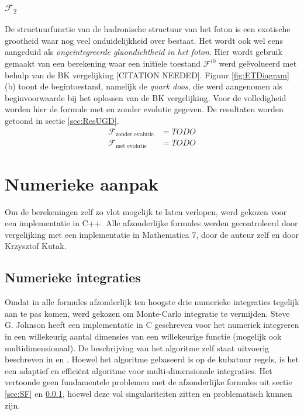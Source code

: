 \documentclass[a4paper,11pt]{article}
\numberwithin{equation}{section} %
\begin{document}
    \subsubsection{$\mathcal{F}_2$} \label{sec:UGD}
De structuurfunctie van de hadronische structuur van het foton is een exotische grootheid waar nog veel onduidelijkheid over bestaat.
Het wordt ook wel eens aangeduid als \textit{ongeïntegreerde gluondichtheid in het foton}.
Hier wordt gebruik gemaakt van een berekening waar een initïele toestand $\mathcal{F}^{(0}$ werd geëvolueerd met behulp van de BK vergelijking [CITATION NEEDED].
Figuur \ref{fig:ETDiagram} (b) toont de begintoestand, namelijk de \textit{quark doos}, die werd aangenomen als beginvoorwaarde bij het oplossen van de BK vergelijking.
Voor de volledigheid worden hier de formule met en zonder evolutie gegeven.
De resultaten worden getoond in sectie \ref{sec:ResUGD}.
\begin{align} \label{eq:UGD}
\mathcal{F}_\text{zonder evolutie} &= TODO \\
\mathcal{F}_\text{met evolutie} &= TODO
\end{align}

\section{Numerieke aanpak}
Om de berekeningen zelf zo vlot mogelijk te laten verlopen, werd gekozen voor een implementatie in C++.
Alle afzonderlijke formules werden gecontroleerd door vergelijking met een implementatie in Mathematica 7, door de auteur zelf en door Krzysztof Kutak.

  \subsection{Numerieke integraties}
Omdat in alle formules afzonderlijk ten hoogste drie numerieke integraties tegelijk aan te pas komen, werd gekozen om Monte-Carlo integratie te vermijden.
Steve G. Johnson heeft een implementatie in C geschreven voor het numeriek integreren in een willekeurig aantal dimensies van een willekeurige functie (mogelijk ook multidimensionaal).
De beschrijving van het algoritme zelf staat uitvoerig beschreven in \cite{Genz} en \cite{Berntsen}.
Hoewel het algoritme gebaseerd is op de kubatuur regels, is het een adaptief en efficiënt algoritme voor multi-dimensionale integraties.
Het vertoonde geen fundamentele problemen met de afzonderlijke formules uit sectie \ref{sec:SF} en \ref{sec:UGD}, hoewel deze vol singulariteiten zitten en problematisch kunnen zijn.
\end{document}
